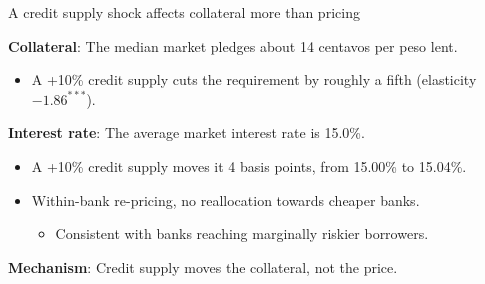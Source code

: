 \documentclass[aspectratio=169]{beamer}
\begin{document}
\begin{frame}{A credit supply shock affects collateral more than pricing}
 
\textbf{Collateral}: The median market pledges about 14 centavos per peso lent.
\begin{itemize}
    \item A +10\% credit supply cuts the requirement by roughly a fifth (elasticity $-1.86^{***}$).
\end{itemize}
 
\pause
\vspace{4mm}
 
\textbf{Interest rate}: The average market interest rate is 15.0\%.
\begin{itemize}
    \item A +10\% credit supply moves it 4 basis points, from 15.00\% to 15.04\%.
    \item Within-bank re-pricing, no reallocation towards cheaper banks.
    \begin{itemize}
        \item Consistent with banks reaching marginally riskier borrowers.
    \end{itemize}
\end{itemize}
 
\vspace{4mm}
\pause
 
\begin{center}
    \large \textbf{Mechanism}: Credit supply moves the collateral, not the price.
\end{center}
 
\end{frame}
 
 
\end{document}
